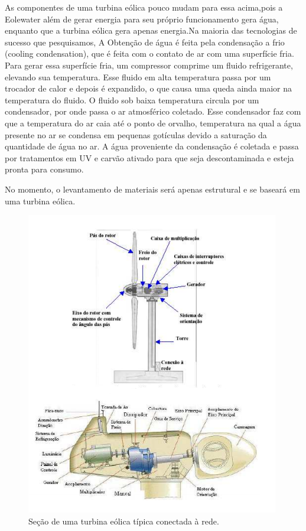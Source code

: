 
As componentes de uma turbina eólica pouco mudam para essa acima,pois a Eolewater além de gerar energia para seu próprio
funcionamento gera água, enquanto que a turbina eólica gera apenas energia.Na maioria das tecnologias de sucesso que 
pesquisamos, A Obtenção de água é feita pela condensação  a frio (cooling condensation), que é feita com o contato de 
ar com uma superfície fria. Para gerar essa superfície fria, um compressor comprime um fluido refrigerante, elevando sua
temperatura. Esse fluido em alta temperatura passa por um trocador de calor e depois é expandido, o que causa uma queda 
ainda maior na temperatura do fluido. O fluido sob baixa temperatura circula por um condensador, por onde passa o ar 
atmosférico coletado. Esse condensador faz com que a temperatura do ar caia até o ponto de orvalho, temperatura na qual a
água presente no ar se condensa em pequenas gotículas devido a saturação da quantidade de água no ar. A água proveniente
da condensação é coletada e passa por tratamentos em UV e carvão ativado para que seja descontaminada e esteja pronta para
consumo.



No momento, o levantamento de materiais será apenas estrutural e se baseará em uma turbina eólica.

\begin{figure}[!htbp]
\centering
\includegraphics[scale=0.80]{editaveis/figuras/turbina}
\caption[Seção de uma turbina eólica]{Seção de uma turbina eólica típica conectada à rede.\footnotemark}
\FloatBarrier
\label{secao_turbina_eolica}
\end{figure}

